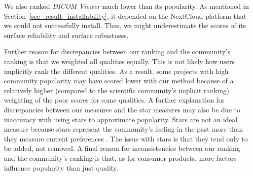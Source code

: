 \documentclass[11pt]{article}
\begin{document}
We also ranked \textit{DICOM Viewer} much lower than its popularity. As
mentioned in Section~\ref{sec_result_installability}, it depended on the
NextCloud platform that we could not successfully install. Thus, we might
underestimate the scores of its surface reliability and surface robustness. 

Further reason for discrepancies between our ranking and the community's ranking
is that we weighted all qualities equally. This is not likely how users
implicitly rank the different qualities. As a result, some projects with high
community popularity may have scored lower with our method because of a
relatively higher (compared to the scientific community's implicit ranking)
weighting of the poor scores for some qualities. A further explanation for
discrepancies between our measures and the star measures may also be due to
inaccuracy with using stars to approximate popularity.  Stars are not an ideal
measure because stars represent the community's feeling in the past more than
they measure current preferences \cite{Szulik2017}.  The issue with stars is
that they tend only to be added, not removed.  A final reason for
inconsistencies between our ranking and the community's ranking is that, as for
consumer products, more factors influence popularity than just quality.
\end{document}
